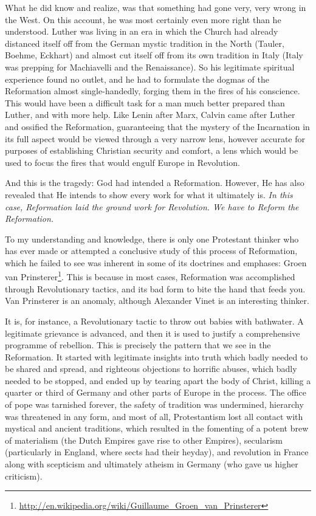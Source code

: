 What he did know and realize, was that something had gone very, very wrong in the West. On this account, he was most certainly even more right than he understood. Luther was living in an era in which the Church had already distanced itself off from the German mystic tradition in the North (Tauler, Boehme, Eckhart) and almost cut itself off from its own tradition in Italy (Italy was prepping for Machiavelli and the Renaissance). So his legitimate spiritual experience found no outlet, and he had to formulate the dogmas of the Reformation almost single-handedly, forging them in the fires of his conscience. This would have been a difficult task for a man much better prepared than Luther, and with more help. Like Lenin after Marx, Calvin came after Luther and ossified the Reformation, guaranteeing that the mystery of the Incarnation in its full aspect would be viewed through a very narrow lens, however accurate for purposes of establishing Christian security and comfort, a lens which would be used to focus the fires that would engulf Europe in Revolution.

And this is the tragedy: God had intended a Reformation. However, He has also revealed that He intends to show every work for what it ultimately is. \emph{In this case, Reformation laid the ground work for Revolution. We have to Reform the Reformation.}

To my understanding and knowledge, there is only one Protestant thinker who has ever made or attempted a conclusive study of this process of Reformation, which he failed to see was inherent in some of its doctrines and emphases: Groen van Prinsterer\footnote{\url{http://en.wikipedia.org/wiki/Guillaume\_Groen\_van\_Prinsterer}}. This is because in most cases, Reformation was accomplished through Revolutionary tactics, and its bad form to bite the hand that feeds you. Van Prinsterer is an anomaly, although Alexander Vinet is an interesting thinker.

It is, for instance, a Revolutionary tactic to throw out babies with bathwater. A legitimate grievance is advanced, and then it is used to justify a comprehensive programme of rebellion. This is precisely the pattern that we see in the Reformation. It started with legitimate insights into truth which badly needed to be shared and spread, and righteous objections to horrific abuses, which badly needed to be stopped, and ended up by tearing apart the body of Christ, killing a quarter or third of Germany and other parts of Europe in the process. The office of pope was tarnished forever, the safety of tradition was undermined, hierarchy was threatened in any form, and most of all, Protestantism lost all contact with mystical and ancient traditions, which resulted in the fomenting of a potent brew of materialism (the Dutch Empires gave rise to other Empires), secularism (particularly in England, where sects had their heyday), and revolution in France along with scepticism and ultimately atheism in Germany (who gave us higher criticism).

